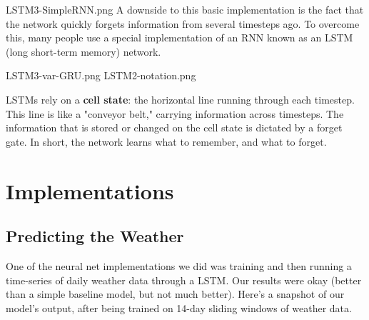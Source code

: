 \documentclass[]{article}
\begin{document}
  LSTM3-SimpleRNN.png
A downside to this basic implementation is the fact that the network quickly forgets information from several timesteps ago. To overcome this, many people use a special implementation of an RNN known as an LSTM (long short-term memory) network.

  LSTM3-var-GRU.png
  LSTM2-notation.png
  
LSTMs rely on a \textbf{cell state}: the horizontal line running through each timestep. This line is like a "conveyor belt," carrying information across timesteps. The information that is stored or changed on the cell state is dictated by a forget gate. In short, the network learns what to remember, and what to forget.

\section{Implementations}

\subsection{Predicting the Weather}

One of the neural net implementations we did was training and then running a time-series of daily weather data through a LSTM. Our results were okay (better than a simple baseline model, but not much better). Here's a snapshot of our model's output, after being trained on 14-day sliding windows of weather data.
\end{document}
